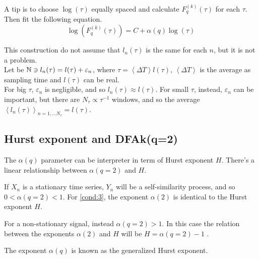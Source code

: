 A tip is to choose $\log(\tau)$ equally spaced and calculate $F_q^{( k )}(\tau )$ for each $\tau$. Then fit the following equation.
\begin{equation}
	\log(F_q^{( k )}(\tau )) = C + \alpha(q) \log(\tau)
\end{equation}

This construction do not assume that $l_n(\tau)$ is the same for each $n$, but it is not a problem. \\
Let be $\mathbb{N} \ni l_n(\tau) = l(\tau) + \varepsilon_n$, where $\tau = \left< \Delta T\right> l(\tau)$, $\left< \Delta T\right>$ is the average as sampling time and $l(\tau)$ can be real. \\
For big $\tau$, $\varepsilon_n$ is negligible, and so $l_n(\tau) \approx l(\tau)$. For small $\tau$, instead, $\varepsilon_n$ can be important, but there are $N_{\tau} \propto \tau^{-1}$ windows, and so the average $\left< l_n(\tau) \right>_{n = 1, \dots N_{\tau}} = l(\tau)$.

\subsection{Hurst exponent and DFAk(q=2)}
The $\alpha(q)$ parameter can be interpreter in term of Hurst exponent $H$. There's a linear relationship between $\alpha(q=2)$ and $H$.

If $X_n$ is a stationary time series, $Y_n$ will be a self-similarity process, and so $0 < \alpha(q = 2) < 1$. For \autoref{cond:3}, the exponent $\alpha(2)$ is identical to the Hurst exponent $H$.

For a non-stationary signal, instead $\alpha(q = 2) > 1$. In this case the relation between the exponents $\alpha(2)$ and $H$ will be $H = \alpha(q = 2)-1$ \cite{Movahed_2006}.  

The exponent $\alpha(q)$ is known as the generalized Hurst exponent.